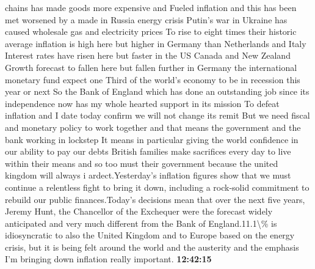 \documentclass{article}%
\begin{document}
chains has made goods more expensive and Fueled inflation and this has been met worsened by a made in Russia energy crisis Putin's war in Ukraine has caused wholesale gas and electricity prices To rise to eight times their historic average inflation is high here but higher in Germany than Netherlands and Italy Interest rates have risen here but faster in the US Canada and New Zealand Growth forecast to fallen here but fallen further in Germany the international monetary fund expect one Third of the world's economy to be in recession this year or next So the Bank of England which has done an outstanding job since its independence now has my whole hearted support in its mission To defeat inflation and I date today confirm we will not change its remit But we need fiscal and monetary policy to work together and that means the government and the bank working in lockstep It means in particular giving the world confidence in our ability to pay our debts British families make sacrifices every day to live within their means and so too must their government because the united kingdom will always  i ardect.Yesterday's inflation figures show that we must continue a relentless fight to bring it down, including a rock{-}solid commitment to rebuild our public finances.Today's decisions mean that over the next five years, Jeremy Hunt, the Chancellor of the Exchequer were the forecast widely anticipated and very much different from the Bank of England.11.1\textbackslash{}\% is idiosyncratic to also the United Kingdom and to Europe based on the energy crisis, but it is being felt around the world and the austerity and the emphasis I'm bringing down inflation really important.%
\textbf{12:42:15}%
\newline%
\end{document}
